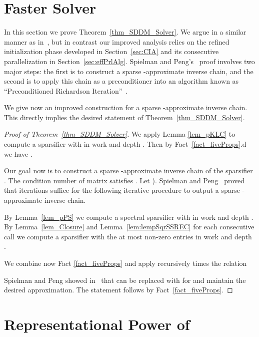 \documentclass[11pt]{article}
\newcommand{\lemref}[1]{Lemma~\ref{lem:#1}}
\numberwithin{thm}{section}
\begin{document}
\section{Faster  Solver}\label{sec:SDDMSolver}

In this section we prove Theorem~\ref{thm_SDDM_Solver}. We argue in a similar manner as in~\cite{PS14}, but in contrast our improved analysis relies on the refined initialization phase developed in Section~\ref{sec:CIA} and its consecutive parallelization in Section~\ref{sec:effPrlAlg}. Spielman and Peng's~\cite{PS14} proof involves two major steps: the first is to construct a sparse -approximate inverse chain, and the second is to apply this chain as a preconditioner into an algorithm known as ``Preconditioned Richardson Iteration''~\cite[Lemma 4.4]{PS14}.

We give now an improved construction for a sparse -approximate inverse chain. This directly implies the desired statement of Theorem~\ref{thm_SDDM_Solver}.

\begin{proof}[Proof of Theorem~\ref{thm_SDDM_Solver}]

We apply Lemma \ref{lem_pKLC} to compute a sparsifier  with  in work  and depth . Then by Fact~\ref{fact_fiveProps}.d we have .

Our goal now is to construct a sparse -approximate inverse chain of the sparsifier . The condition number of matrix  satisfies . Let ). Spielman and Peng~\cite{PS14} proved that  iterations suffice for the following iterative procedure to output a sparse -approximate inverse chain.

By Lemma~\ref{lem_pPS} we compute a spectral sparsifier  with  in work  and depth . By Lemma~\ref{lem_Closure} and \lemref{lempSqrSSREC} for each consecutive call we compute a sparsifier  with the at most  non-zero entries in work  and depth .

We combine now Fact \ref{fact_fiveProps} and apply recursively  times the relation

Spielman and Peng showed in~\cite[Corollary 5.5]{PS14} that  can be replaced with  for  and maintain the desired approximation. The statement follows by Fact~\ref{fact_fiveProps}.
\end{proof}



\section{Representational Power of }\label{sec:APMDBD}
\end{document}
